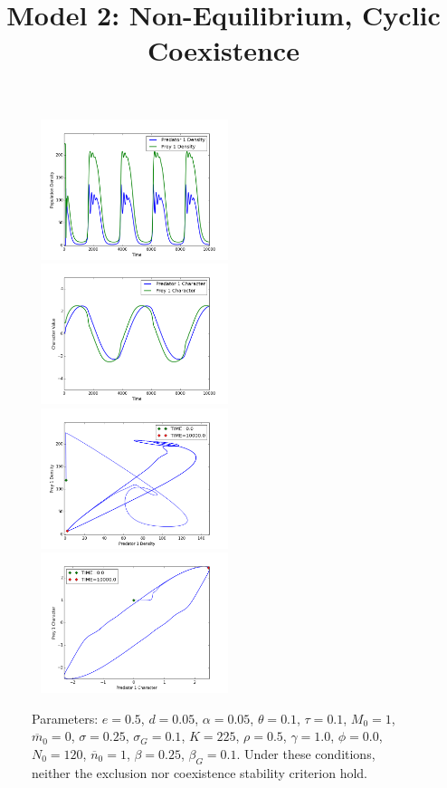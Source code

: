 \documentclass{amsart}
\theoremstyle{definition}
\theoremstyle{remark}
\numberwithin{equation}{section}
\begin{document}
\begin{centering}
\begin{figure}
		\label{fig:variable_growth_coexistence_equilibrium}
	\end{figure}
	\begin{figure}
		\title{\bf Model 2: Non-Equilibrium, Cyclic Coexistence\\}
		\includegraphics[width=6cm,height=4.1cm]{figures/1x1/variable_growth/stable_cycles/densities.png}
		\includegraphics[width=6cm,height=4.1cm]{figures/1x1/variable_growth/stable_cycles/traits.png}
		\includegraphics[width=6cm,height=4.1cm]{figures/1x1/variable_growth/stable_cycles/density_phase_plane.png}
		\includegraphics[width=6cm,height=4.1cm]{figures/1x1/variable_growth/stable_cycles/trait_phase_plane.png}
		\caption{\footnotesize Parameters: $e = 0.5$, $d = 0.05$, $\alpha = 0.05$, $\theta = 0.1$, $\tau = 0.1$, $M_0 = 1$, $\overline{m}_0 = 0$, $\sigma = 0.25$, $\sigma_G = 0.1$, $K = 225$, $\rho = 0.5$, $\gamma = 1.0$, $\phi = 0.0$, $N_0 = 120$, $\overline{n}_0 = 1$, $\beta = 0.25$, $\beta_G = 0.1$.  Under these conditions, neither the exclusion nor coexistence stability criterion hold.}
		\label{fig:variable_growth_stable_cycles}
	\end{figure}
\end{centering}
\end{document}
